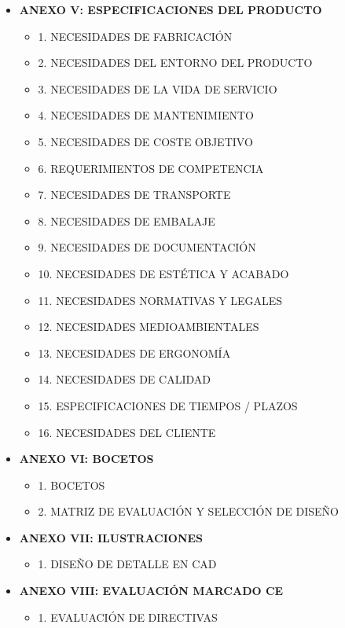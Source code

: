 \documentclass[11pt,a4paper]{article}
\begin{document}
\begin{itemize}[label={}, leftmargin=0cm, itemsep=1.2em]
\begin{itemize}[label=\color{ArthroTeal}\textbullet, leftmargin=0.6cm, itemsep=0.5em, topsep=0.3cm]
        \item \textbf{ANEXO V: ESPECIFICACIONES DEL PRODUCTO} 
        \begin{itemize}[label=\color{ArthroGray}\circ, leftmargin=0.5cm, itemsep=0.2em, topsep=0.1cm]
            \small
            \item 1. NECESIDADES DE FABRICACIÓN 
            \item2. NECESIDADES DEL ENTORNO DEL PRODUCTO 
            \item3. NECESIDADES DE LA VIDA DE SERVICIO
            \item4. NECESIDADES DE MANTENIMIENTO 
            \item5. NECESIDADES DE COSTE OBJETIVO 
            \item6. REQUERIMIENTOS DE COMPETENCIA 
           \item 7. NECESIDADES DE TRANSPORTE 
            \item8. NECESIDADES DE EMBALAJE 
            \item9. NECESIDADES DE DOCUMENTACIÓN 
            \item10. NECESIDADES DE ESTÉTICA Y ACABADO 
            \item11. NECESIDADES NORMATIVAS Y LEGALES 
            \item12. NECESIDADES MEDIOAMBIENTALES 
            \item13. NECESIDADES DE ERGONOMÍA 
            \item14. NECESIDADES DE CALIDAD 
            \item15. ESPECIFICACIONES DE TIEMPOS / PLAZOS 
            \item16. NECESIDADES DEL CLIENTE 
        \end{itemize}
        
        \item \textbf{ANEXO VI: BOCETOS} 
        \begin{itemize}[label=\color{ArthroGray}\circ, leftmargin=0.5cm, itemsep=0.2em, topsep=0.1cm]
            \small
            \item 1. BOCETOS 
            \item 2. MATRIZ DE EVALUACIÓN Y SELECCIÓN DE DISEÑO 
            
        \end{itemize}
        
        \item \textbf{ANEXO VII: ILUSTRACIONES} 
        \begin{itemize}[label=\color{ArthroGray}\circ, leftmargin=0.5cm, itemsep=0.2em, topsep=0.1cm]
            \small
            \item 1. DISEÑO DE DETALLE EN CAD 
           
        \end{itemize}
        
        \item \textbf{ANEXO VIII: EVALUACIÓN MARCADO CE} 
        \begin{itemize}[label=\color{ArthroGray}\circ, leftmargin=0.5cm, itemsep=0.2em, topsep=0.1cm]
            \small
            \item 1. EVALUACIÓN DE DIRECTIVAS  
            

\end{itemize}
\end{itemize}
\end{itemize}
\end{document}
